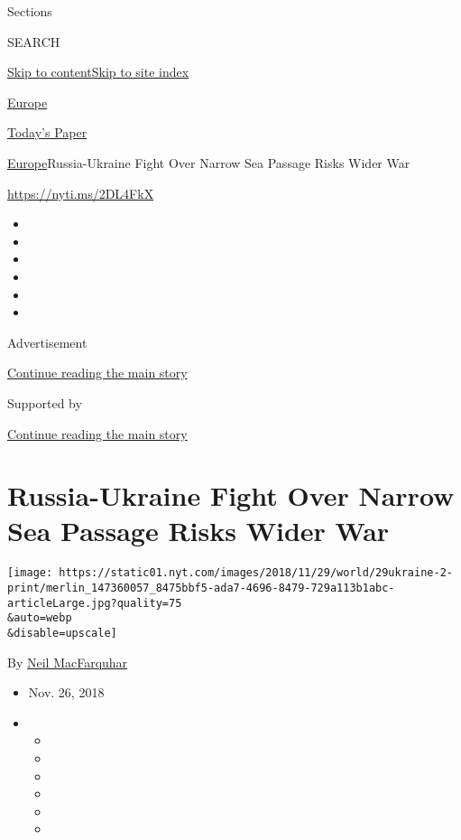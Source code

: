 Sections

SEARCH

\protect\hyperlink{site-content}{Skip to
content}\protect\hyperlink{site-index}{Skip to site index}

\href{https://www.nytimes.com/section/world/europe}{Europe}

\href{https://myaccount.nytimes.com/auth/login?response_type=cookie\&client_id=vi}{}

\href{https://www.nytimes.com/section/todayspaper}{Today's Paper}

\href{/section/world/europe}{Europe}\textbar{}Russia-Ukraine Fight Over
Narrow Sea Passage Risks Wider War

\url{https://nyti.ms/2DL4FkX}

\begin{itemize}
\item
\item
\item
\item
\item
\item
\end{itemize}

Advertisement

\protect\hyperlink{after-top}{Continue reading the main story}

Supported by

\protect\hyperlink{after-sponsor}{Continue reading the main story}

\hypertarget{russia-ukraine-fight-over-narrow-sea-passage-risks-wider-war}{%
\section{Russia-Ukraine Fight Over Narrow Sea Passage Risks Wider
War}\label{russia-ukraine-fight-over-narrow-sea-passage-risks-wider-war}}

\texttt{[image: https://static01.nyt.com/images/2018/11/29/world/29ukraine-2-print/merlin\_147360057\_8475bbf5-ada7-4696-8479-729a113b1abc-articleLarge.jpg?quality=75\\\&auto=webp\\\&disable=upscale]}

By \href{https://www.nytimes.com/by/neil-macfarquhar}{Neil MacFarquhar}

\begin{itemize}
\item
  Nov. 26, 2018
\item
  \begin{itemize}
  \item
  \item
  \item
  \item
  \item
  \item
  \end{itemize}
\end{itemize}

